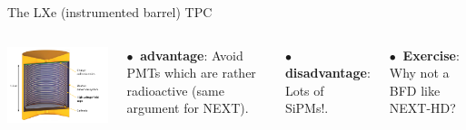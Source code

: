 \documentclass [aspectratio=169]{beamer}
\newcommand{\BI}{\ensuremath{{}^{214}{\rm Bi}}}
\begin{document}
\begin{frame}{The LXe (instrumented barrel) TPC}
\begin{columns}
\includegraphics[scale=0.6]{nexosketch.png}

$\bullet~$ {\bf advantage}: Avoid PMTs which are rather radioactive (same argument for NEXT). 

$\bullet~$ {\bf disadvantage}: Lots of SiPMs!. 

$\bullet~$ {\bf Exercise}: Why not a BFD like NEXT-HD?  
\end{columns}
\end{frame}

%
%
%
%
%
% 
\end{document}
